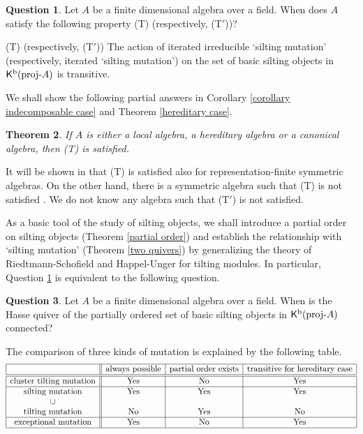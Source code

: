 \documentclass[a4paper,reqno]{amsart}
\newtheorem{theorem}{Theorem}[section]
\theoremstyle{definition}
\newtheorem{question}[theorem]{Question}
\newcommand{\TT}{{\mathcal T}}
\newcommand{\silt}{\operatorname{silt}\nolimits}
\newcommand{\proj}[1]{{\rm{proj}}\text{-}#1} %
\newcommand{\K}{\mathsf{K}}
\begin{document}
\begin{question}\label{transitive question}
Let $A$ be a finite dimensional algebra over a field.
When does $A$ satisfy the following property (T) (respectively, (T$'$))?

(T) (respectively, (T$'$)) The action of iterated irreducible `silting mutation'
(respectively, iterated `silting mutation') on the set of basic silting objects in $\K^{\rm b}(\proj{A})$ is transitive.
\end{question}

We shall show the following partial answers in Corollary \ref{corollary indecomposable case} and Theorem \ref{hereditary case}.

\begin{theorem}
If $A$ is either a local algebra, a hereditary algebra or a canonical algebra, then (T) is satisfied.
\end{theorem}

It will be shown in \cite{A2} that (T) is satisfied also for representation-finite symmetric algebras.
On the other hand, there is a symmetric algebra such that (T) is not satisfied \cite{AGI}.
We do not know any algebra such that (T$'$) is not satisfied.

As a basic tool of the study of silting objects, we shall introduce
a partial order on silting objects (Theorem \ref{partial order}) and establish the relationship with
`silting mutation' (Theorem \ref{two quivers}) by generalizing the theory of Riedtmann-Schofield and
Happel-Unger for tilting modules.
In particular, Question \ref{transitive question} is equivalent to the following question.

\begin{question}
Let $A$ be a finite dimensional algebra over a field.
When is the Hasse quiver of the partially ordered set of basic silting objects in $\K^{\rm b}(\proj{A})$ connected?
\end{question}



The comparison of three kinds of mutation is explained by the following table.
\[\begin{array}{|c||c|c|c|}
\hline
&\mbox{always possible}&\mbox{partial order exists}&\mbox{transitive for hereditary case}\\ \hline\hline
\mbox{cluster tilting mutation}&\mbox{Yes}&\mbox{No}&\mbox{Yes}\\ \hline
\mbox{silting mutation}&\mbox{Yes}&\mbox{Yes}&\mbox{Yes}\\
\cup&&&\\
\mbox{tilting mutation}&\mbox{No}&\mbox{Yes}&\mbox{No}\\ \hline
\mbox{exceptional mutation}&\mbox{Yes}&\mbox{No}&\mbox{Yes}\\ \hline
\end{array}\]
\end{document}
